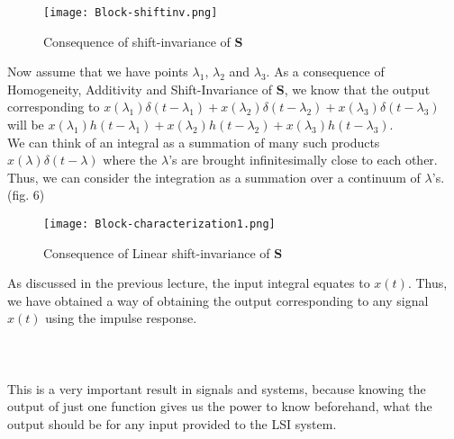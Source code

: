 \begin{figure}[H]
	\centering
	\texttt{[image: Block-shiftinv.png]}
	\caption{Consequence of shift-invariance of \textbf{S}}
\end{figure}

Now assume that we have points $\lambda_1$, $\lambda_2$ and $\lambda_3$. As a consequence of Homogeneity, Additivity and Shift-Invariance of \textbf{S}, we know that the output corresponding to $x(\lambda_1)\delta(t-\lambda_1)+x(\lambda_2)\delta(t-\lambda_2)+x(\lambda_3)\delta(t-\lambda_3)$ will be $x(\lambda_1)h(t-\lambda_1)+x(\lambda_2)h(t-\lambda_2)+x(\lambda_3)h(t-\lambda_3)$.\\
\indent We can think of an integral as a summation of many such products $x(\lambda)\delta(t-\lambda)$ where the $\lambda$'s are brought infinitesimally close to each other. Thus, we can consider the integration as a summation over a continuum of $\lambda$'s. (fig. 6)

\begin{figure}[H]
	\centering
	\texttt{[image: Block-characterization1.png]}
	\caption{Consequence of Linear shift-invariance of \textbf{S}}
\end{figure}
\indent As discussed in the previous lecture, the input integral equates to $x(t)$. Thus, we have obtained a way of obtaining the output corresponding to any signal $x(t)$ using the impulse response.\\\\
\noindent{}
\\\\
This is a very important result in signals and systems, because knowing the output of just one function gives us the power to know beforehand, what the output should be for any input provided to the LSI system.
